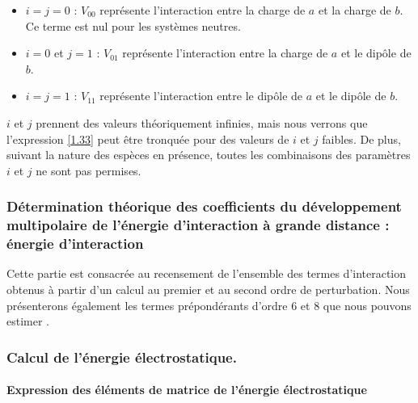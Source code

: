 \documentclass[12pt,a4paper]{book}
\begin{document}
	\begin{itemize}
		\item $i=j=0$ : $V_{00}$ représente l'interaction entre la charge de $a$ et la charge de $b$. Ce terme est nul pour les systèmes neutres. 	
		\item $i=0$ et $j=1$ : $V_{01}$ représente l'interaction entre la charge de $a$ et le dipôle de $b$. 	
		\item $i=j=1$ : $V_{11}$ représente l'interaction entre le dipôle de $a$ et le dipôle de $b$.
	\end{itemize}
	
	$i$ et $j$ prennent des valeurs théoriquement infinies, mais nous verrons que l'expression \ref{1.33} peut être tronquée pour des valeurs de $i$ et $j$ faibles. De plus, suivant la nature des espèces en présence, toutes les combinaisons des paramètres $i$ et $j$ ne sont pas permises.
	
	
	
	\subsubsection{Détermination théorique des coefficients du développement multipolaire de l’énergie d'interaction à grande distance : énergie d’interaction}
	
	
	Cette partie est consacrée au recensement de l'ensemble des termes d'interaction obtenus à partir d'un calcul au premier et au second ordre de perturbation. Nous présenterons également les termes prépondérants d'ordre 6 et 8 que nous pouvons estimer \cite{saute1982calculated}.
	
	\subsubsection{Calcul de l’énergie électrostatique.}
	
	\paragraph{Expression des éléments de matrice de l'énergie électrostatique}
	
\end{document}
